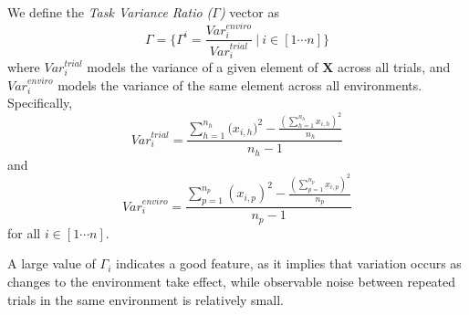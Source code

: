 We define the {\em Task Variance Ratio ($\Gamma$)} vector as
\begin{equation} \Gamma = \{\Gamma^i=\frac{\mathit{Var}_i^{enviro}}{\mathit{Var}_i^{trial}}~\lvert~i\in[1\cdots n] \} \end{equation}
where $\mathit{Var}_i^{trial}$ models the variance of a given element of $\mathbf{X}$ across all trials, 
and $\mathit{Var}_i^{enviro}$ models the variance of the same element across all environments. 
Specifically, 
  \begin{equation}\mathit{Var}_i^{trial}=\frac{\sum_{h=1}^{n_h}({\mathit{x}_{i,h})^2}-\frac{(\sum_{h=1}^{n_h}{\mathit{x}_{i,h}})^2}{n_h}}{n_h-1}\end{equation}
and 
  \begin{equation}\mathit{Var}_i^{enviro} = \frac{\sum_{p=1}^{n_p}{(\mathit{x}_{i,p})^2}-\frac{(\sum_{p=1}^{n_p}{\mathit{x}_{i,p}})^2}{n_p}}{n_p-1}\end{equation}
for all $i \in [1\cdots n]$.

A large value of $\Gamma_i$ indicates a good feature, as it implies that variation occurs as changes to the environment take effect, while observable noise between repeated trials in the same environment is relatively small.

